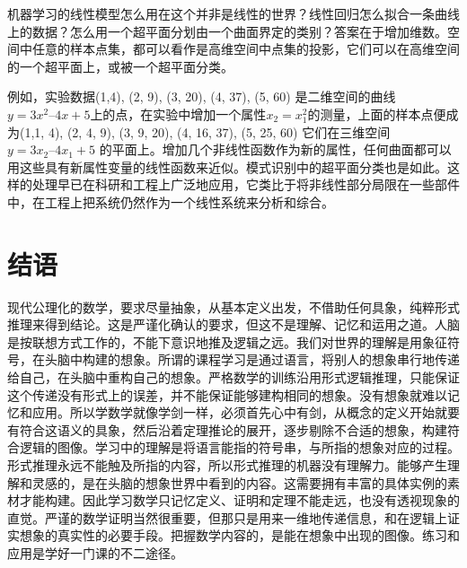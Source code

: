 机器学习的线性模型怎么用在这个并非是线性的世界？线性回归怎么拟合一条曲线上的数据？怎么用一个超平面分划由一个曲面界定的类别？答案在于增加维数。空间中任意的样本点集，都可以看作是高维空间中点集的投影，它们可以在高维空间的一个超平面上，或被一个超平面分类。

例如，实验数据(1,4), (2, 9), (3, 20), (4, 37), (5, 60) 是二维空间的曲线 $ y = 3x^2 – 4x + 5 $上的点，在实验中增加一个属性$ x_2 = x_1^2 $的测量，上面的样本点便成为(1,1, 4), (2, 4, 9), (3, 9, 20), (4, 16, 37), (5, 25, 60) 它们在三维空间$ y =3x_2 – 4x_1 + 5 $ 的平面上。增加几个非线性函数作为新的属性，任何曲面都可以用这些具有新属性变量的线性函数来近似。模式识别中的超平面分类也是如此。这样的处理早已在科研和工程上广泛地应用，它类比于将非线性部分局限在一些部件中，在工程上把系统仍然作为一个线性系统来分析和综合。

\section{结语}

现代公理化的数学，要求尽量抽象，从基本定义出发，不借助任何具象，纯粹形式推理来得到结论。这是严谨化确认的要求，但这不是理解、记忆和运用之道。人脑是按联想方式工作的，不能下意识地推及逻辑之远。我们对世界的理解是用象征符号，在头脑中构建的想象。所谓的课程学习是通过语言，将别人的想象串行地传递给自己，在头脑中重构自己的想象。严格数学的训练沿用形式逻辑推理，只能保证这个传递没有形式上的误差，并不能保证能够建构相同的想象。没有想象就难以记忆和应用。所以学数学就像学剑一样，必须首先心中有剑，从概念的定义开始就要有符合这语义的具象，然后沿着定理推论的展开，逐步剔除不合适的想象，构建符合逻辑的图像。学习中的理解是将语言能指的符号串，与所指的想象对应的过程。形式推理永远不能触及所指的内容，所以形式推理的机器没有理解力。能够产生理解和灵感的，是在头脑的想象世界中看到的内容。这需要拥有丰富的具体实例的素材才能构建。因此学习数学只记忆定义、证明和定理不能走远，也没有透视现象的直觉。严谨的数学证明当然很重要，但那只是用来一维地传递信息，和在逻辑上证实想象的真实性的必要手段。把握数学内容的，是能在想象中出现的图像。练习和应用是学好一门课的不二途径。